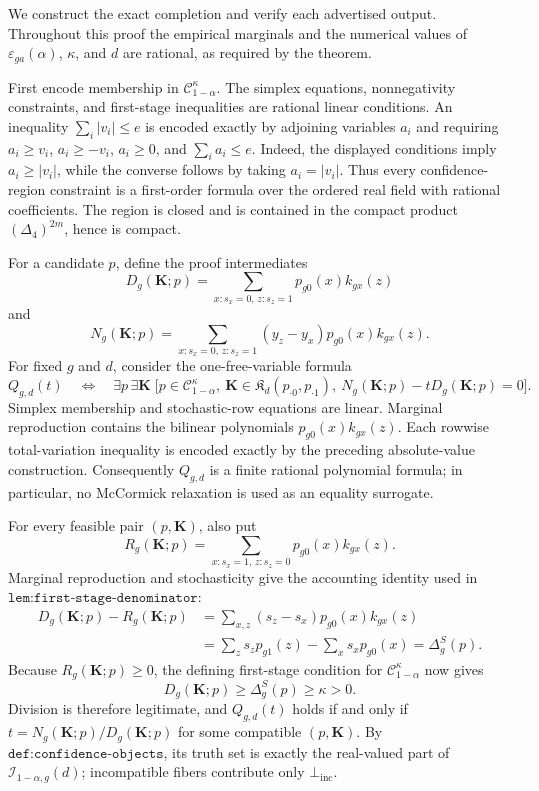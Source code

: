 We construct the exact completion and verify each advertised output.  Throughout this proof the empirical marginals and the numerical values of \(\varepsilon_{ga}(\alpha)\), \(\kappa\), and \(d\) are rational, as required by the theorem.

First encode membership in \(\mathcal C_{1-\alpha}^{\kappa}\).  The simplex equations, nonnegativity constraints, and first-stage inequalities are rational linear conditions.  An inequality \(\sum_i|v_i|\le e\) is encoded exactly by adjoining variables \(a_i\) and requiring \(a_i\ge v_i\), \(a_i\ge-v_i\), \(a_i\ge0\), and \(\sum_i a_i\le e\).  Indeed, the displayed conditions imply \(a_i\ge|v_i|\), while the converse follows by taking \(a_i=|v_i|\).  Thus every confidence-region constraint is a first-order formula over the ordered real field with rational coefficients.  The region is closed and is contained in the compact product \((\Delta_4)^{2m}\), hence is compact.

For a candidate \(p\), define the proof intermediates
\[
 D_g(\mathbf K;p)=\sum_{x:s_x=0,\,z:s_z=1}p_{g0}(x)k_{gx}(z)
\]
and
\[
 N_g(\mathbf K;p)=\sum_{x:s_x=0,\,z:s_z=1}(y_z-y_x)p_{g0}(x)k_{gx}(z).
\]
For fixed \(g\) and \(d\), consider the one-free-variable formula
\[
 Q_{g,d}(t)\quad\Longleftrightarrow\quad
 \exists p\,\exists\mathbf K\;
 \bigl[p\in\mathcal C_{1-\alpha}^{\kappa},\ 
 \mathbf K\in\mathfrak K_d(p_{\cdot0},p_{\cdot1}),\ 
 N_g(\mathbf K;p)-tD_g(\mathbf K;p)=0\bigr].
\]
Simplex membership and stochastic-row equations are linear.  Marginal reproduction contains the bilinear polynomials \(p_{g0}(x)k_{gx}(z)\).  Each rowwise total-variation inequality is encoded exactly by the preceding absolute-value construction.  Consequently \(Q_{g,d}\) is a finite rational polynomial formula; in particular, no McCormick relaxation is used as an equality surrogate.

For every feasible pair \((p,\mathbf K)\), also put
\[
 R_g(\mathbf K;p)=\sum_{x:s_x=1,\,z:s_z=0}p_{g0}(x)k_{gx}(z).
\]
Marginal reproduction and stochasticity give the accounting identity used in \(\texttt{lem:first-stage-denominator}\):
\[
\begin{aligned}
 D_g(\mathbf K;p)-R_g(\mathbf K;p)
 &=\sum_{x,z}(s_z-s_x)p_{g0}(x)k_{gx}(z)\\
 &=\sum_z s_zp_{g1}(z)-\sum_xs_xp_{g0}(x)
 =\Delta_g^S(p).
\end{aligned}
\]
Because \(R_g(\mathbf K;p)\ge0\), the defining first-stage condition for \(\mathcal C_{1-\alpha}^{\kappa}\) now gives
\[
 D_g(\mathbf K;p)\ge \Delta_g^S(p)\ge\kappa>0.
\]
Division is therefore legitimate, and \(Q_{g,d}(t)\) holds if and only if \(t=N_g(\mathbf K;p)/D_g(\mathbf K;p)\) for some compatible \((p,\mathbf K)\).  By \(\texttt{def:confidence-objects}\), its truth set is exactly the real-valued part of \(\mathcal I_{1-\alpha,g}(d)\); incompatible fibers contribute only \(\bot_{\mathrm{inc}}\).

